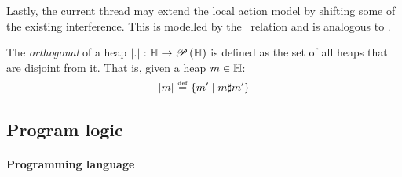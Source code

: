 Lastly, the current thread may extend the local action model by shifting some of the existing interference. This is modelled by the \shiftG\ relation and is analogous to \shiftR.
%
%
\begin{definition}[Orthogonal]\label{def:orthogonal}
The \emph{orthogonal} of a heap  $\left\lvert .\right\rvert_{}: \mathbb{H} \rightarrow \mathscr{P}\left(\mathbb{H} \right)$ is defined as the set of all heaps that are disjoint from it. That is, given a heap $m \in \mathbb{H}$:
%
\[
	\left\lvert m\right\rvert_{} \mathrel{\stackrel{\smash{\scriptscriptstyle{\mathrm{def}}}}{=}} \left\{ m' \mid m \sharp m' \right\}
\]
%
\end{definition}
%
%	



\subsection{Program logic}

\paragraph{Programming language}

